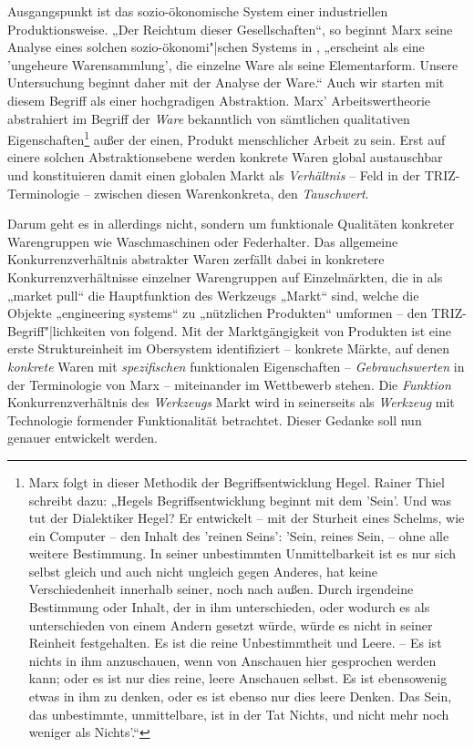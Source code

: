 \documentclass[11pt,a4paper]{article}
\begin{document}
Ausgangspunkt ist das sozio-ökonomische System einer industriellen
Produktionsweise. „Der Reichtum dieser Gesellschaften“, so beginnt Marx seine
Analyse eines solchen sozio-ökonomi"|schen Systems in \cite{MEW23}, „erscheint
als eine 'ungeheure Warensammlung', die einzelne Ware als seine
Elementarform. Unsere Untersuchung beginnt daher mit der Analyse der Ware.“
Auch wir starten mit diesem Begriff als einer hochgradigen Abstraktion.  Marx'
Arbeitswertheorie abstrahiert im Begriff der \emph{Ware} bekanntlich von
sämtlichen qualitativen Eigenschaften\footnote{Marx folgt in dieser Methodik
  der Begriffsentwicklung Hegel. Rainer Thiel \cite[S. 190]{Thiel2007}
  schreibt dazu: „Hegels Begriffsentwicklung beginnt mit dem 'Sein'. Und was
  tut der Dialektiker Hegel? Er entwickelt – mit der Sturheit eines Schelms,
  wie ein Computer – den Inhalt des 'reinen Seins': 'Sein, reines Sein, --
  ohne alle weitere Bestimmung. In seiner unbestimmten Unmittelbarkeit ist es
  nur sich selbst gleich und auch nicht ungleich gegen Anderes, hat keine
  Verschiedenheit innerhalb seiner, noch nach außen. Durch irgendeine
  Bestimmung oder Inhalt, der in ihm unterschieden, oder wodurch es als
  unterschieden von einem Andern gesetzt würde, würde es nicht in seiner
  Reinheit festgehalten. Es ist die reine Unbestimmtheit und Leere. – Es ist
  nichts in ihm anzuschauen, wenn von Anschauen hier gesprochen werden kann;
  oder es ist nur dies reine, leere Anschauen selbst. Es ist ebensowenig etwas
  in ihm zu denken, oder es ist ebenso nur dies leere Denken. Das Sein, das
  unbestimmte, unmittelbare, ist in der Tat Nichts, und nicht mehr noch
  weniger als Nichts'.“ } außer der einen, Produkt menschlicher Arbeit zu
sein. Erst auf einere solchen Abstraktionsebene werden konkrete Waren global
austauschbar und konstituieren damit einen globalen Markt als
\emph{Verhältnis} -- Feld in der TRIZ-Terminologie -- zwischen diesen
Warenkonkreta, den \emph{Tauschwert}.

Darum geht es in \cite{TESE2018} allerdings nicht, sondern um funktionale
Qualitäten konkreter Warengruppen wie Waschmaschinen oder Federhalter. Das
allgemeine Konkurrenzverhältnis abstrakter Waren zerfällt dabei in konkretere
Konkurrenzverhältnisse einzelner Warengruppen auf Einzelmärkten, die in
\cite{TESE2018} als „market pull“ die Hauptfunktion des Werkzeugs „Markt“
sind, welche die Objekte „engineering systems“ zu „nützlichen Produkten“
umformen -- den TRIZ-Begriff"|lichkeiten von \cite{TT} folgend. Mit der
Marktgängigkeit von Produkten ist eine erste Struktureinheit im Obersystem
identifiziert -- konkrete Märkte, auf denen \emph{konkrete} Waren mit
\emph{spezifischen} funktionalen Eigenschaften -- \emph{Gebrauchswerten} in
der Terminologie von Marx -- miteinander im Wettbewerb stehen.  Die
\emph{Funktion} Konkurrenzverhältnis des \emph{Werkzeugs} Markt wird in
\cite{TESE2018} seinerseits als \emph{Werkzeug} mit Technologie formender
Funktionalität betrachtet.  Dieser Gedanke soll nun genauer entwickelt werden.
\end{document}

